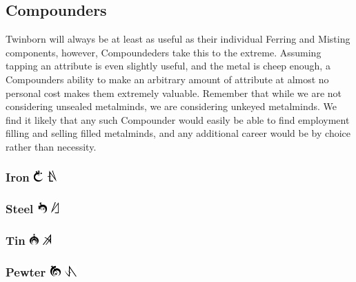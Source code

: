 \documentclass[conference]{IEEEtran}
\begin{document}
\subsection{\textbf{Compounders}}
Twinborn will always be at least as useful as their individual Ferring and Misting components, however, Compoundeders take this to the extreme.  Assuming tapping an attribute is even slightly useful, and the metal is cheep enough, a Compounders ability to make an arbitrary amount of attribute at almost no personal cost makes them extremely valuable.  Remember that while we are not considering unsealed metalminds, we are considering unkeyed metalminds.  We find it likely that any such Compounder would easily be able to find employment filling and selling filled metalminds, and any additional career would be by choice rather than necessity.
        \subsubsection{\textbf{Iron}  	   \includegraphics[height=1em]{images/Iron.png}		\includegraphics[height=1em]{images/Iron_(Feruchemy).png}}		\label{sec:compounder:iron}
    \subsubsection{\textbf{Steel}  	   \includegraphics[height=1em]{images/Steel.png}		\includegraphics[height=1em]{images/Steel_(Feruchemy).png}}		\label{sec:compounder:steel}
    \subsubsection{\textbf{Tin}        \includegraphics[height=1em]{images/Tin.png}			\includegraphics[height=1em]{images/Tin_(Feruchemy).png}}		\label{sec:compounder:tin}
    \subsubsection{\textbf{Pewter}     \includegraphics[height=1em]{images/Pewter.png}		\includegraphics[height=1em]{images/Pewter_(Feruchemy).png}}		\label{sec:compounder:pewter}
\end{document}
